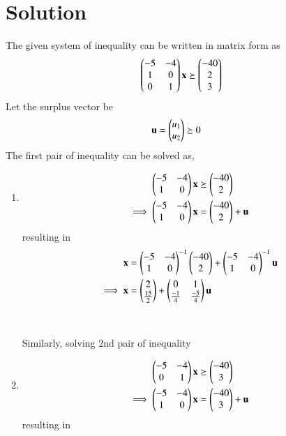 \documentclass[journal,12pt,twocolumn]{IEEEtran}
\begin{document}
\section{Solution}
The given system of inequality can be written in matrix form as
\begin{align}
    \begin{pmatrix}-5 & -4 \\ 1 & 0 \\ 0 & 1\end{pmatrix}\mathbf{x} \succeq \begin{pmatrix}-40\\2\\3\end{pmatrix}
\end{align}
Let the surplus vector be
\begin{align}
    \mathbf{u} &= \begin{pmatrix}u_1\\u_2\end{pmatrix} \succeq 0
\end{align}
The first pair of inequality can be solved as,
\begin{enumerate}
    \item 
    \begin{align}
        \begin{pmatrix}-5 & -4 \\ 1 & 0\end{pmatrix}\mathbf{x} &\succeq \begin{pmatrix}-40 \\ 2\end{pmatrix}
        \\
        \implies  \begin{pmatrix}-5 & -4 \\ 1 & 0\end{pmatrix}\mathbf{x} &= \begin{pmatrix}-40 \\ 2\end{pmatrix} + \mathbf{u}
    \end{align}
    resulting in 
    \begin{align}
        \mathbf{x} &= \begin{pmatrix}-5 & -4 \\1 & 0\end{pmatrix}^{-1}\begin{pmatrix}-40 \\ 2\end{pmatrix} + \begin{pmatrix}-5 & -4 \\1 & 0\end{pmatrix}^{-1}\mathbf{u}
        \\
        \implies \mathbf{x} &= \begin{pmatrix}2 \\\frac{15}{2}\end{pmatrix} + \begin{pmatrix}0 & 1\\ \frac{-1}{4} & \frac{-5}{4}\end{pmatrix}\mathbf{u}   \label{eq1}
    \end{align}
    \\
    \\
    Similarly, solving 2nd pair of inequality
    \item 
    
    \begin{align}
        \begin{pmatrix}-5 & -4\\ 0 & 1\end{pmatrix}\mathbf{x} &\succeq \begin{pmatrix}-40 \\ 3\end{pmatrix}
        \\
        \implies  \begin{pmatrix}-5 & -4 \\ 1 & 0\end{pmatrix}\mathbf{x} &= \begin{pmatrix}-40 \\ 3\end{pmatrix} + \mathbf{u}
    \end{align}
    resulting in 
    

\end{enumerate}
\end{document}

